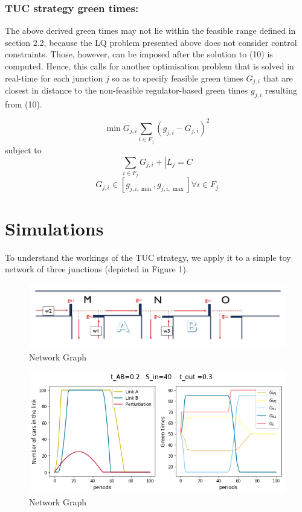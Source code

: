 \documentclass[11pt]{article}
\begin{document}
\subsubsection*{TUC strategy green times:}
The above derived green times may not lie within the feasible range defined in section 2.2, because the LQ problem presented above does not consider control constraints. Those, however, can be imposed after the solution to (10) is computed. Hence, this calls for another optimisation problem that is solved in real-time for each junction $j$ so as to specify feasible green times $G _ { j , i }$ that are closest in distance to the non-feasible regulator-based green times $g _ { j , i }$ resulting from (10).


\begin{equation} \operatorname { min } { G _ { j , i } } \sum _ { i \in F _ { j } } \left( g _ { j , i } - G _ { j , i } \right) ^ { 2 }\end{equation} 
subject to
\begin{equation} 
\sum _ { i \in F _ { j } } G _ { j , i } + \left| L _ { j } = C \right.
\end{equation} 
\begin{equation} 
G _ { j , i } \in \left[ g _ { j , i , \min } , g _ { j , i , \max } \right] \forall i \in F _ { j }
\end{equation} 

\section{Simulations}
To understand the workings of the TUC strategy, we apply it to a simple toy network of three junctions (depicted in Figure 1). 

\begin{figure}
    \caption{Network Graph}
      \centering
	\includegraphics[width=15cm]{network-graph}
\end{figure}

\begin{figure}
    \caption{Network Graph}
      \centering
	\includegraphics[width=15cm]{sim1}
\end{figure}
\end{document}
